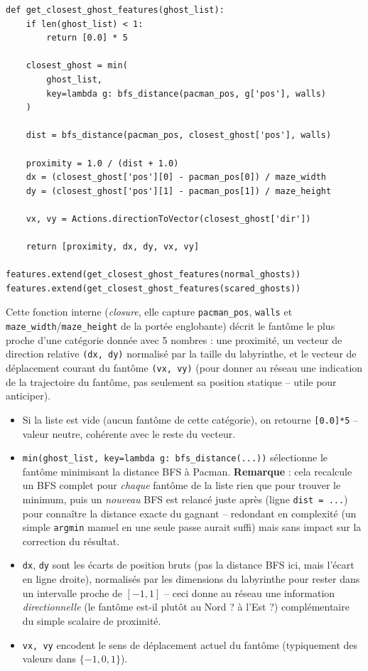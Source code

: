 \documentclass[a4paper,12pt]{article}
\begin{document}
\begin{lstlisting}
def get_closest_ghost_features(ghost_list):
    if len(ghost_list) < 1:
        return [0.0] * 5

    closest_ghost = min(
        ghost_list,
        key=lambda g: bfs_distance(pacman_pos, g['pos'], walls)
    )

    dist = bfs_distance(pacman_pos, closest_ghost['pos'], walls)

    proximity = 1.0 / (dist + 1.0)
    dx = (closest_ghost['pos'][0] - pacman_pos[0]) / maze_width
    dy = (closest_ghost['pos'][1] - pacman_pos[1]) / maze_height

    vx, vy = Actions.directionToVector(closest_ghost['dir'])

    return [proximity, dx, dy, vx, vy]

features.extend(get_closest_ghost_features(normal_ghosts))
features.extend(get_closest_ghost_features(scared_ghosts))
\end{lstlisting}

Cette fonction interne (\emph{closure}, elle capture \texttt{pacman\_pos},
\texttt{walls} et \texttt{maze\_width}/\texttt{maze\_height} de la portée
englobante) décrit le fantôme le plus proche d'une catégorie donnée avec
5 nombres : une proximité, un vecteur de direction relative
\texttt{(dx, dy)} normalisé par la taille du labyrinthe, et le vecteur de
déplacement courant du fantôme \texttt{(vx, vy)} (pour donner au réseau
une indication de la trajectoire du fantôme, pas seulement sa position
statique -- utile pour anticiper).

\begin{itemize}
    \item Si la liste est vide (aucun fantôme de cette catégorie), on
    retourne \texttt{[0.0]*5} -- valeur neutre, cohérente avec le reste
    du vecteur.
    \item \texttt{min(ghost\_list, key=lambda g: bfs\_distance(...))}
    sélectionne le fantôme minimisant la distance BFS à Pacman.
    \textbf{Remarque} : cela recalcule un BFS complet pour \emph{chaque}
    fantôme de la liste rien que pour trouver le minimum, puis un
    \emph{nouveau} BFS est relancé juste après (ligne \texttt{dist = ...})
    pour connaître la distance exacte du gagnant -- redondant en
    complexité (un simple \texttt{argmin} manuel en une seule passe
    aurait suffi) mais sans impact sur la correction du résultat.
    \item \texttt{dx}, \texttt{dy} sont les écarts de position bruts
    (pas la distance BFS ici, mais l'écart en ligne droite), normalisés
    par les dimensions du labyrinthe pour rester dans un intervalle
    proche de $[-1, 1]$ -- ceci donne au réseau une information
    \emph{directionnelle} (le fantôme est-il plutôt au Nord ? à l'Est ?)
    complémentaire du simple scalaire de proximité.
    \item \texttt{vx, vy} encodent le sens de déplacement actuel du
    fantôme (typiquement des valeurs dans $\{-1, 0, 1\}$).
\end{itemize}
\end{document}
